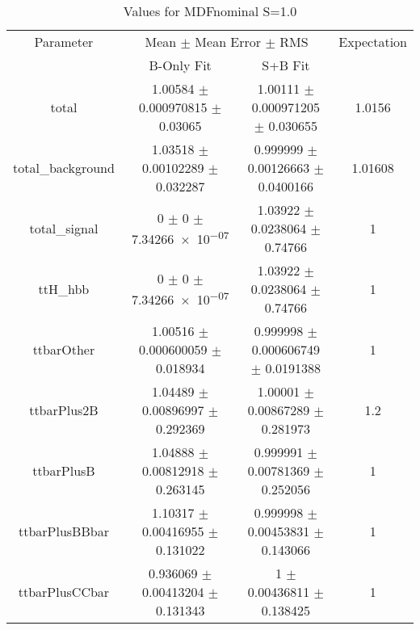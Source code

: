 \begin{table}
\centering
\caption{Values for MDFnominal S=1.0}
\begin{tabular}{cccc}
\toprule
Parameter & \multicolumn{2}{c}{Mean $\pm$ Mean Error $\pm$ RMS} & Expectation\\
 & B-Only Fit & S+B Fit & \\
\midrule
total & \num{1.00584} $\pm$ \num{0.000970815} $\pm$ \num{0.03065} & \num{1.00111} $\pm$ \num{0.000971205} $\pm$ \num{0.030655} & \num{1.0156}\\
total\_background & \num{1.03518} $\pm$ \num{0.00102289} $\pm$ \num{0.032287} & \num{0.999999} $\pm$ \num{0.00126663} $\pm$ \num{0.0400166} & \num{1.01608}\\
total\_signal & \num{0} $\pm$ \num{0} $\pm$ \num{7.34266e-07} & \num{1.03922} $\pm$ \num{0.0238064} $\pm$ \num{0.74766} & \num{1}\\
ttH\_hbb & \num{0} $\pm$ \num{0} $\pm$ \num{7.34266e-07} & \num{1.03922} $\pm$ \num{0.0238064} $\pm$ \num{0.74766} & \num{1}\\
ttbarOther & \num{1.00516} $\pm$ \num{0.000600059} $\pm$ \num{0.018934} & \num{0.999998} $\pm$ \num{0.000606749} $\pm$ \num{0.0191388} & \num{1}\\
ttbarPlus2B & \num{1.04489} $\pm$ \num{0.00896997} $\pm$ \num{0.292369} & \num{1.00001} $\pm$ \num{0.00867289} $\pm$ \num{0.281973} & \num{1.2}\\
ttbarPlusB & \num{1.04888} $\pm$ \num{0.00812918} $\pm$ \num{0.263145} & \num{0.999991} $\pm$ \num{0.00781369} $\pm$ \num{0.252056} & \num{1}\\
ttbarPlusBBbar & \num{1.10317} $\pm$ \num{0.00416955} $\pm$ \num{0.131022} & \num{0.999998} $\pm$ \num{0.00453831} $\pm$ \num{0.143066} & \num{1}\\
ttbarPlusCCbar & \num{0.936069} $\pm$ \num{0.00413204} $\pm$ \num{0.131343} & \num{1} $\pm$ \num{0.00436811} $\pm$ \num{0.138425} & \num{1}\\
\bottomrule
\end{tabular}
\end{table}